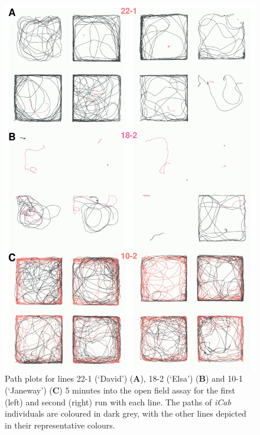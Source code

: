 \documentclass[
]{book}
\begin{document}
\begin{figure}
\includegraphics[width=1\linewidth]{figs/mikk_behaviour/path_plot_22-1_18-2_10-1_300} \caption{Path plots for lines \textcolor{22-1 (‘David’)_FB737A}{22-1 (‘David’)} (\textbf{A}), \textcolor{18-2 (‘Elsa’)_FF66A6}{18-2 (‘Elsa’)} (\textbf{B}) and \textcolor{10-1 (‘Janeway’)_F8766D}{10-1 (‘Janeway’)} (\textbf{C}) 5 minutes into the open field assay for the first (left) and second (right) run with each line. The paths of \emph{\textcolor{iCab_424B4D}{iCab}} individuals are coloured in dark grey, with the other lines depicted in their representative colours.}\label{fig:extreme-paths}
\end{figure}
\end{document}
